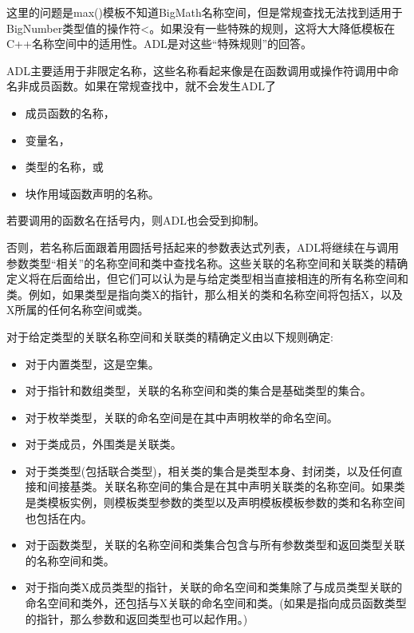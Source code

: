 这里的问题是max()模板不知道BigMath名称空间，但是常规查找无法找到适用于BigNumber类型值的操作符<。如果没有一些特殊的规则，这将大大降低模板在C++名称空间中的适用性。ADL是对这些“特殊规则”的回答。



ADL主要适用于非限定名称，这些名称看起来像是在函数调用或操作符调用中命名非成员函数。如果在常规查找中，就不会发生ADL了

\begin{itemize}
\item 
成员函数的名称，

\item 
变量名，

\item 
类型的名称，或

\item 
块作用域函数声明的名称。
\end{itemize}

若要调用的函数名在括号内，则ADL也会受到抑制。

否则，若名称后面跟着用圆括号括起来的参数表达式列表，ADL将继续在与调用参数类型“相关”的名称空间和类中查找名称。这些关联的名称空间和关联类的精确定义将在后面给出，但它们可以认为是与给定类型相当直接相连的所有名称空间和类。例如，如果类型是指向类X的指针，那么相关的类和名称空间将包括X，以及X所属的任何名称空间或类。

对于给定类型的关联名称空间和关联类的精确定义由以下规则确定:

\begin{itemize}
\item 
对于内置类型，这是空集。

\item 
对于指针和数组类型，关联的名称空间和类的集合是基础类型的集合。

\item 
对于枚举类型，关联的命名空间是在其中声明枚举的命名空间。

\item 
对于类成员，外围类是关联类。

\item 
对于类类型(包括联合类型)，相关类的集合是类型本身、封闭类，以及任何直接和间接基类。关联名称空间的集合是在其中声明关联类的名称空间。如果类是类模板实例，则模板类型参数的类型以及声明模板模板参数的类和名称空间也包括在内。

\item 
对于函数类型，关联的名称空间和类集合包含与所有参数类型和返回类型关联的名称空间和类。

\item 
对于指向类X成员类型的指针，关联的命名空间和类集除了与成员类型关联的命名空间和类外，还包括与X关联的命名空间和类。(如果是指向成员函数类型的指针，那么参数和返回类型也可以起作用。)
\end{itemize}

